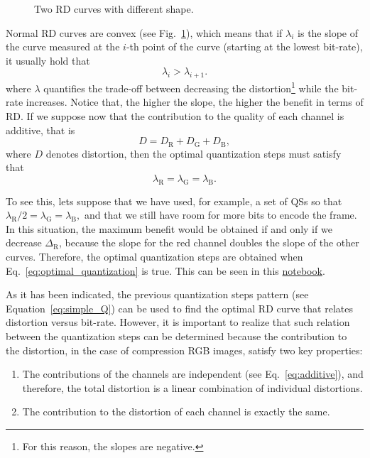 \begin{figure}
  \centering
  \caption{Two RD curves with different shape.}
  \label{fig:RD_slopes}
\end{figure}

Normal RD curves are convex (see Fig.~\ref{fig:RD_slopes}), which
means that if $\lambda_i$ is the slope of the curve measured at the
$i$-th point of the curve (starting at the lowest bit-rate), it
usually hold that
\begin{equation}
  \lambda_i > \lambda_{i+1}.
\end{equation}
where $\lambda$ quantifies the trade-off between decreasing the
distortion\footnote{For this reason, the slopes are negative.} while
the bit-rate increases. Notice that, the higher the slope, the higher
the benefit in terms of RD. If we suppose now that the contribution to
the quality of each channel is additive, that is
\begin{equation}
  D = D_{\text{R}} + D_{\text{G}} + D_{\text{B}},
  \label{eq:additive}
\end{equation}
where $D$ denotes distortion, then the optimal quantization steps must
satisfy that~\cite{vetterli1995wavelets,sayood2017introduction}
\begin{equation}
  \lambda_{\text{R}} = \lambda_{\text{G}} = \lambda_{\text{B}}.
  \label{eq:optimal_quantization}
\end{equation}

To see this, lets suppose that we have used, for example, a set of QSs
so that $\lambda_{\text{R}}/2 = \lambda_{\text{G}} =
\lambda_{\text{B}},$ and that we still have room for more bits to
encode the frame. In this situation, the maximum benefit would be
obtained if and only if we decrease $\Delta_{\text{R}}$, because the
slope for the red channel doubles the slope of the other
curves. Therefore, the optimal quantization steps are obtained when
Eq.~\ref{eq:optimal_quantization} is true. This can be seen in this
\href{https://github.com/Sistemas-Multimedia/Sistemas-Multimedia.github.io/blob/master/milestones/05-RGB_compression/RGB_compression.ipynb}{notebook}.

As it has been indicated, the previous quantization steps pattern (see
Equation~\ref{eq:simple_Q}) can be used to find the optimal RD curve
that relates distortion versus bit-rate. However, it is important to
realize that such relation between the quantization steps can be
determined because the contribution to the distortion, in the case of
compression RGB images, satisfy two key properties:
\begin{enumerate}
\item The contributions of the channels are independent (see
  Eq.~\ref{eq:additive}), and therefore, the total distortion is a
  linear combination of individual distortions.
\item The contribution to the distortion of each channel is exactly
  the same.
\end{enumerate}

